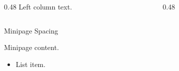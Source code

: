 \documentclass[14pt,t]{beamer}
\title{}
\author{}
\date{}
\begin{document}
\begin{frame}
\begin{columns}
\begin{column}{0.48\textwidth}
Left column text.
\end{column}
\begin{column}{0.48\textwidth}
\end{column}
\end{columns}
\end{frame}
\begin{frame}{Minipage Spacing}
\begin{minipage}{\textwidth}
Minipage content.
\end{minipage}
\begin{itemize}
\item List item.
\end{itemize}
\end{frame}
\end{document}
